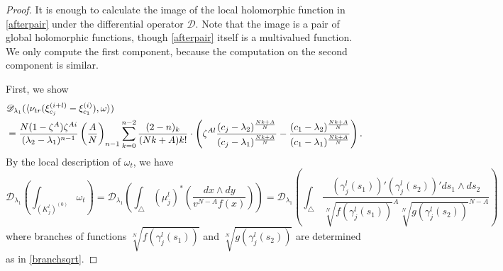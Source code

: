 \documentclass[10pt,a4paper]{amsart}
\renewcommand{\l}{\lambda}
\begin{document}
\begin{proof}
It is enough to calculate the image of the local holomorphic function in \eqref{afterpair} under the differential operator $\mathscr{D}$.
Note that the image is a pair of global holomorphic functions, though \eqref{afterpair} itself is a multivalued function.
We only compute the first component, because the computation on the second component is similar.

First, we show 
\begin{align} \label{eq11}
\begin{split}
&\mathscr{D}_{\l_1}(\langle \nu_{\rm tr}(\xi_{c_j}^{(i+l)} - \xi_{c_1}^{(i)}), \omega \rangle) \\
&=
\frac{N(1-\zeta^A)\zeta^{Ai}}{(\l_2-\l_1)^{n-1}} \left(\dfrac{A}N\right)_{n-1}
\displaystyle  \sum_{k=0}^{n-2}  \dfrac{(2-n)_k}{(Nk+A)k!} \cdot  
\left(
\zeta^{Al} \frac{(c_j-\l_2)^{\frac{Nk+A}{N}}}{(c_j-\l_1)^{\frac{Nk+A}{N}}}- \frac{(c_1-\l_2)^{\frac{Nk+A}{N}}}{(c_1-\l_1)^{\frac{Nk+A}{N}}}
\right). 
\end{split}
\end{align}
By the local description of $\omega_t$, we have
\begin{equation*}
\mathscr{D}_{\l_1} \left(\int_{(K_j^l)^{(0)}} \omega_t\right) = 
\mathscr{D}_{\l_1}\left(\int_{\triangle}(\mu_j^l)^*\left(\dfrac{dx\wedge dy}{v^{N-A}f(x)}\right)\right)
=\mathscr{D}_{\l_1} \left(\int_{\triangle} \dfrac{(\gamma_j^l(s_1))'(\gamma_j^l(s_2))'ds_1\wedge ds_2}{\sqrt[N]{f(\gamma_j^l(s_1))}^A \sqrt[N]{g(\gamma_j^l(s_2))}^{N-A}}\right)
\end{equation*}
where branches of functions $\sqrt[N]{f(\gamma_j^l(s_1))}$ and $\sqrt[N]{g(\gamma_j^l(s_2))}$ are determined as in \eqref{branchsqrt}.


\end{proof}
\end{document}
